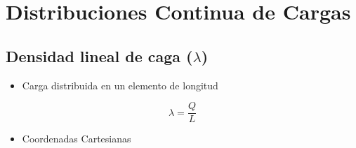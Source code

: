 \section{Distribuciones Continua de Cargas}
\subsection{Densidad lineal de caga ($\lambda$)}
\begin{itemize}
    \item Carga distribuida en un elemento de longitud
\end{itemize}
\begin{equation}
    \lambda = \frac{Q}{L}
\end{equation}
\begin{itemize}
    \item Coordenadas Cartesianas
\end{itemize}